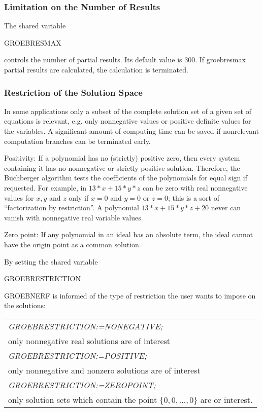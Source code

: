 \subsubsection{Limitation on the Number of Results}
The shared variable
\begin{center}
GROEBRESMAX
\end{center}
controls the number of partial results. Its default value is 300. If
groebresmax partial results are calculated, the calculation is
terminated.


\subsubsection{Restriction of the Solution Space}
In some applications only a subset of the complete solution set
of a given set of equations is relevant, e.g. only
nonnegative values or positive definite values for the variables.
A significant amount of computing time can be saved if
nonrelevant computation branches can be terminated early.

Positivity: If a polynomial has no (strictly) positive zero, then
every system containing it has no nonnegative or strictly positive
solution. Therefore, the Buchberger algorithm tests the coefficients of
the polynomials for equal sign if requested. For example, in $13*x +
15*y*z $ can be zero with real nonnegative values for $x, y$ and $z$
only if $x=0$ and $y=0$ or $ z=0$; this is a sort of ``factorization by
restriction''. A polynomial $13*x + 15*y*z + 20$ never can vanish
with nonnegative real variable values.

Zero point:  If any polynomial in an ideal has an absolute term, the ideal
cannot have the origin point as a common solution.

By setting the shared variable
\begin{center} GROEBRESTRICTION \end{center}
GROEBNERF is informed of the type of restriction the user wants to
impose on the solutions:
\begin{center}
\begin{tabular}{l}
{\it GROEBRESTRICTION:=NONEGATIVE;} \\
\hspace*{+.5cm} only nonnegative real solutions are of
interest\vspace*{4mm} \\
{\it GROEBRESTRICTION:=POSITIVE;} \\
\hspace*{+.5cm}only nonnegative and nonzero solutions are of
interest\vspace*{4mm} \\
{\it GROEBRESTRICTION:=ZEROPOINT;} \\
\hspace*{+.5cm}only solution sets which contain the point
$\{0,0,\ldots,0\}$ are or interest.
\end{tabular}
\end{center}

